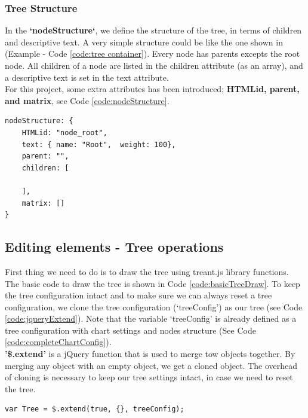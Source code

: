 \documentclass[11pt]{article} %
\begin{document}
\subsubsection{Tree Structure}
In the \textbf{`nodeStructure`}, we define the structure of the tree, in terms of children and descriptive text. A very simple structure could be like the one shown in (Example - Code \ref{code:tree container}).  Every node has parents excepts the root node. All children of a node are listed in the children attribute (as an array), and a descriptive text is set in the text attribute.\\
\noindent
For this project, some extra attributes has been introduced; \textbf{HTMLid, parent, and matrix}, see Code \ref{code:nodeStructure}.

\noindent
\begin{minipage}[c]{\linewidth}
\begin{lstlisting}[basicstyle=\scriptsize, tabsize=4, frame=single, caption=nodeStructure code, label=code:nodeStructure]
nodeStructure: {
	HTMLid: "node_root",
	text: { name: "Root",  weight: 100},
	parent: "",
	children: [
			
	],
	matrix: []
}
\end{lstlisting}
\end{minipage}

\subsection{Editing elements - Tree operations}
First thing we need to do is to draw the tree using treant.js library functions. The basic code to draw the tree is shown in Code \ref{code:basicTreeDraw}. To keep the tree configuration intact and to make sure we can always reset a tree configuration, we clone the tree configuration (`treeConfig') as our tree (see Code \ref{code:jqueryExtend}). Note that the variable `treeConfig' is already defined as a tree configuration with chart settings and nodes structure (See Code \ref{code:completeChartConfig}).\\[6pt]

\noindent
\textbf{'\$.extend'} is a jQuery function that is used to merge tow objects together. By merging any object with an empty object, we get a cloned object. The overhead of cloning is necessary to keep our tree settings intact, in case we need to reset the tree.

\noindent
\begin{minipage}[c]{\linewidth}
\begin{lstlisting}[basicstyle=\scriptsize, tabsize=4, frame=single, caption=\$.extend syntax, label=code:jqueryExtend]
var Tree = $.extend(true, {}, treeConfig);
\end{lstlisting}
\end{minipage}
\end{document}
